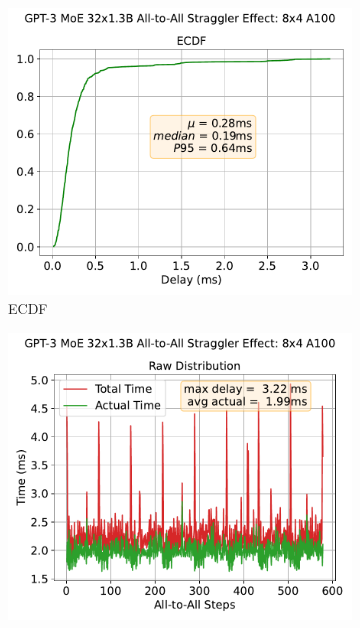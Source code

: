 \begin{figure}[!h]
    \centering
    \begin{subfigure}{0.4\textwidth}
        \centering
        \includegraphics[width=\linewidth, keepaspectratio]{figures/GPT-3_MoE_32x1.3B_ecdf}
        \caption{ECDF}
        \label{sub:ecdf_perl}
    \end{subfigure}
    \begin{subfigure}{0.4\textwidth}
        \centering
        \includegraphics[width=\linewidth, keepaspectratio]{figures/GPT-3_MoE_32x1.3B}

\end{subfigure}
\end{figure}
